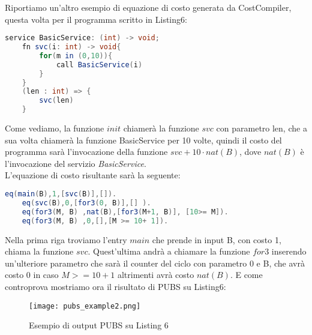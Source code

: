 \documentclass[../../main.tex]{subfiles}
\begin{document}
Riportiamo un'altro esempio di equazione di costo generata da CostCompiler, questa volta per il programma scritto in Listing6:
\begin{lstlisting}[caption={Listing 6}, language=Java]
    service BasicService: (int) -> void;
    fn svc(i: int) -> void{
        for(m in (0,10)){
            call BasicService(i)
        }
    }
    (len : int) => {
        svc(len)
    }
\end{lstlisting}
Come vediamo, la funzione $init$ chiamerà la funzione $svc$ con parametro len, che a sua volta chiamerà la funzione BasicService per 10 volte, quindi il costo del programma sarà l'invocazione della funzione $svc + 10 \cdot nat(B)$, dove $nat(B)$ è l'invocazione del servizio \textit{BasicService}.\\
L'equazione di costo risultante sarà la seguente:
\begin{lstlisting}[language=Java,caption={Equazione di costo PUBS per Listing6}]
    eq(main(B),1,[svc(B)],[]).
    eq(svc(B),0,[for3(0, B)],[] ).
    eq(for3(M, B) ,nat(B),[for3(M+1, B)], [10>= M]).
    eq(for3(M, B) ,0,[],[M >= 10+ 1]).
\end{lstlisting}

Nella prima riga troviamo l'entry $main$ che prende in input B, con costo 1, chiama la funzione $svc$.
Quest'ultima andrà a chiamare la funzione $for3$ inserendo un'ulteriore parametro che sarà il counter del ciclo con parametro 0 e B, che avrà costo 0 in caso $M >= 10 + 1$ altrimenti avrà costo $nat(B)$.
E come controprova mostriamo ora il risultato di PUBS su Listing6:
\begin{figure}[H]
    \centering
    \texttt{[image: pubs\_example2.png]}
    \caption{Esempio di output PUBS su Listing 6}
\end{figure}
\end{document}
